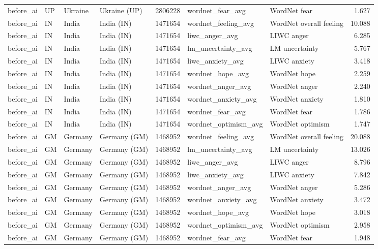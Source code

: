 \begin{tabular}{llllrllr}
before\_ai & UP & Ukraine & Ukraine (UP) & 2806228 & wordnet\_fear\_avg & WordNet fear & 1.627 \\
before\_ai & IN & India & India (IN) & 1471654 & wordnet\_feeling\_avg & WordNet overall feeling & 10.088 \\
before\_ai & IN & India & India (IN) & 1471654 & liwc\_anger\_avg & LIWC anger & 6.285 \\
before\_ai & IN & India & India (IN) & 1471654 & lm\_uncertainty\_avg & LM uncertainty & 5.767 \\
before\_ai & IN & India & India (IN) & 1471654 & liwc\_anxiety\_avg & LIWC anxiety & 3.418 \\
before\_ai & IN & India & India (IN) & 1471654 & wordnet\_hope\_avg & WordNet hope & 2.259 \\
before\_ai & IN & India & India (IN) & 1471654 & wordnet\_anger\_avg & WordNet anger & 2.240 \\
before\_ai & IN & India & India (IN) & 1471654 & wordnet\_anxiety\_avg & WordNet anxiety & 1.810 \\
before\_ai & IN & India & India (IN) & 1471654 & wordnet\_fear\_avg & WordNet fear & 1.786 \\
before\_ai & IN & India & India (IN) & 1471654 & wordnet\_optimism\_avg & WordNet optimism & 1.747 \\
before\_ai & GM & Germany & Germany (GM) & 1468952 & wordnet\_feeling\_avg & WordNet overall feeling & 20.088 \\
before\_ai & GM & Germany & Germany (GM) & 1468952 & lm\_uncertainty\_avg & LM uncertainty & 13.026 \\
before\_ai & GM & Germany & Germany (GM) & 1468952 & liwc\_anger\_avg & LIWC anger & 8.796 \\
before\_ai & GM & Germany & Germany (GM) & 1468952 & liwc\_anxiety\_avg & LIWC anxiety & 7.842 \\
before\_ai & GM & Germany & Germany (GM) & 1468952 & wordnet\_anger\_avg & WordNet anger & 5.286 \\
before\_ai & GM & Germany & Germany (GM) & 1468952 & wordnet\_anxiety\_avg & WordNet anxiety & 3.472 \\
before\_ai & GM & Germany & Germany (GM) & 1468952 & wordnet\_hope\_avg & WordNet hope & 3.018 \\
before\_ai & GM & Germany & Germany (GM) & 1468952 & wordnet\_optimism\_avg & WordNet optimism & 2.958 \\
before\_ai & GM & Germany & Germany (GM) & 1468952 & wordnet\_fear\_avg & WordNet fear & 1.948 \\

\end{tabular}
